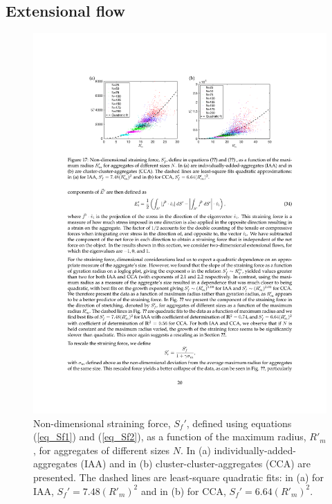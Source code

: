 \subsection{Extensional flow}


\begin{figure}[ht]
	\begin{center}
		 \includegraphics[scale = 1.0]{./figures/fig_strain_allprime.pdf}
	\end{center}
	\caption{Non-dimensional straining force, $S_f'$, defined using equations (\ref{eq_Sf1}) and (\ref{eq_Sf2}), as a function of the maximum radius, $R'_m$, for aggregates of different sizes $N$. In (a) individually-added-aggregates (IAA) and in (b) cluster-cluster-aggregates (CCA) are presented. The dashed lines are least-square quadratic fits: in (a) for IAA, $S_f' =7.48 (R'_m)^2 $ and in (b) for CCA, $S_f'  = 6.64 (R'_m)^2$.}
	\label{fig_strain_maxR}
\end{figure}

